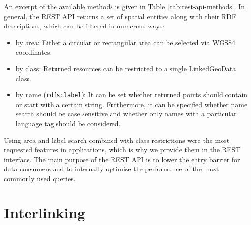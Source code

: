An excerpt of the available methods is given in Table~\ref{tab:rest-api-methods}.
In general, the REST API returns a set of spatial entities along with their RDF descriptions, which can be filtered in numerous ways:
\begin{itemize}
 \item by area: Either a circular or rectangular area can be selected via WGS84 coordinates.
 \item by class: Returned resources can be restricted to a single LinkedGeoData class.
 \item by name (\verb|rdfs:label|): It can be set whether returned points should contain or start with a certain string. Furthermore, it can be specified whether name search should be case sensitive and whether only names with a particular language tag should be considered.
\end{itemize}
Using area and label search combined with class restrictions were the most requested features in applications, which is why we provide them in the REST interface.
The main purpose of the REST API is to lower the entry barrier for data consumers and to internally optimise the performance of the most commonly used queries.

\section{Interlinking}
\label{sec:interlinking}

